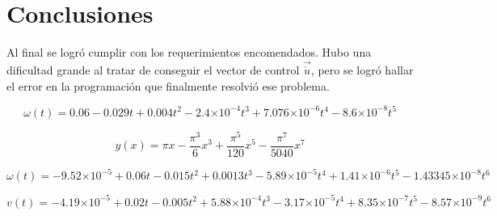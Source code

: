 \documentclass[spanish,10pt,letterpaper, twocolumn]{article}
\providecommand{\e}[1]{\ensuremath{\times 10^{#1}}}
\begin{document}
\section{Conclusiones}
Al final se logr\'o cumplir con los requerimientos encomendados. Hubo una dificultad grande al tratar de conseguir el vector de control $\vec{\dot{u}}$, pero se logr\'o hallar el error en la programaci\'on que finalmente resolvi\'o ese problema.

\begin{equation}
		\omega (t)=0.06-0.029t+0.004t^2-2.4\e{-4} t^3 
		 +7.076\e{-6}t^4-8.6\e{-8}t^5
\end{equation}


\begin{equation}
	y(x)=\pi x-\frac{\pi ^3}{6}x^3+\frac{\pi ^5}{120}x^5-\frac{\pi ^7}{5040}x^7
\end{equation}


\begin{equation}
\omega(t)=-9.52\e{-5}+0.06t-0.015t^2
	+0.0013t^3-5.89\e{-5}t^4+1.41\e{-6}t^5
	-1.43345\e{-8}t^6
\end{equation}

\begin{equation}
	v(t)=-4.19\e{-5}+0.02t-0.005t^2
	+5.88\e{-4}t^3-3.17\e{-5}t^4
	+8.35\e{-7}
t^5-8.57\e{-9}t^6
\end{equation}
\end{document}
